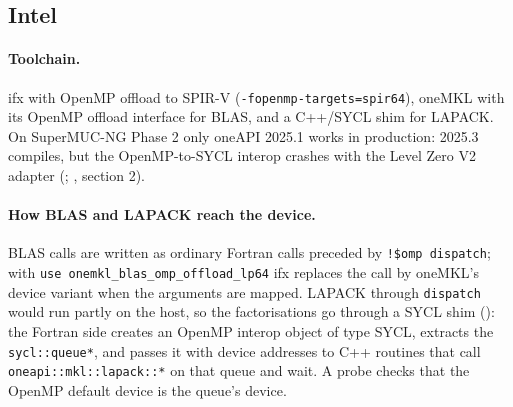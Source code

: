 \subsection{Intel}
\label{sec:intel}

\paragraph{Toolchain.} ifx with OpenMP offload to SPIR-V (\texttt{-fopenmp-targets=spir64}), oneMKL with its OpenMP offload interface for BLAS, and a C++/SYCL shim for LAPACK. On SuperMUC-NG Phase 2 only oneAPI 2025.1 works in production: 2025.3 compiles, but the OpenMP-to-SYCL interop crashes with the Level Zero V2 adapter (; , section 2).


\paragraph{How BLAS and LAPACK reach the device.} BLAS calls are written as ordinary Fortran calls preceded by \texttt{!\$omp dispatch}; with \texttt{use onemkl\_blas\_omp\_offload\_lp64} ifx replaces the call by oneMKL's device variant when the arguments are mapped. LAPACK through \texttt{dispatch} would run partly on the host, so the factorisations go through a SYCL shim (): the Fortran side creates an OpenMP interop object of type SYCL, extracts the \texttt{sycl::queue*}, and passes it with device addresses to C++ routines that call \texttt{oneapi::mkl::lapack::*} on that queue and wait. A probe checks that the OpenMP default device is the queue's device.

